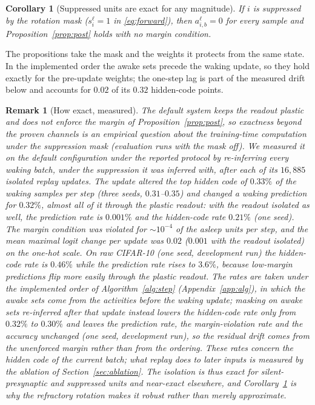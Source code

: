 \documentclass{article}
\newtheorem{corollary}{Corollary}
\newtheorem{remark}{Remark}
\begin{document}
\begin{corollary}[Suppressed units are exact for any magnitude]
\label{cor:refr}
If $i$ is suppressed by the rotation mask ($s^\ell_i=1$ in \eqref{eq:forward}), then
$a^\ell_{i,b}=0$ for every sample and Proposition~\ref{prop:post} holds with no margin condition.
\end{corollary}
The propositions take the mask and the weights it protects from the same state. In the
implemented order the awake sets precede the waking update, so they hold exactly for the
pre-update weights; the one-step lag is part of the measured drift below and accounts for
$0.02$ of its $0.32$ hidden-code points.

\begin{remark}[How exact, measured]
The default system keeps the readout plastic and does not enforce the margin of
Proposition~\ref{prop:post}, so exactness beyond the proven channels is an empirical
question about the training-time computation under the suppression mask (evaluation runs
with the mask off). We measured it on the default configuration under the reported protocol
by re-inferring every waking batch, under the suppression it was inferred with, after each of
its $16{,}885$ isolated replay updates. The update altered the top hidden code of $0.33\%$ of
the waking samples per step (three seeds, $0.31$--$0.35$) and changed a waking prediction for
$0.32\%$, almost all of it through the plastic readout: with the readout isolated as well, the
prediction rate is $0.001\%$ and the hidden-code rate $0.21\%$ (one seed). The margin
condition was violated for $\sim\!10^{-4}$ of the asleep units per step, and the mean maximal
logit change per update was $0.02$ ($0.001$ with the readout isolated) on the one-hot scale.
On raw CIFAR-10 (one seed, development run) the hidden-code rate is $0.46\%$ while the
prediction rate rises to $3.6\%$, because low-margin predictions flip more easily through the
plastic readout. The rates are taken under the implemented order of Algorithm~\ref{alg:step}
(Appendix~\ref{app:alg}), in which the awake sets come from the activities before the waking
update; masking on awake sets re-inferred after that update instead lowers the hidden-code
rate only from $0.32\%$ to $0.30\%$ and leaves the prediction rate, the margin-violation rate
and the accuracy unchanged (one seed, development run), so the residual drift comes from the
unenforced margin rather than from the ordering. These rates concern the hidden code of the
\emph{current} batch; what replay does to later inputs is measured by the ablation of
Section~\ref{sec:ablation}. The isolation is thus exact for silent-presynaptic and suppressed
units and near-exact elsewhere, and Corollary~\ref{cor:refr} is why the refractory rotation
makes it robust rather than merely approximate.
\end{remark}
\end{document}
